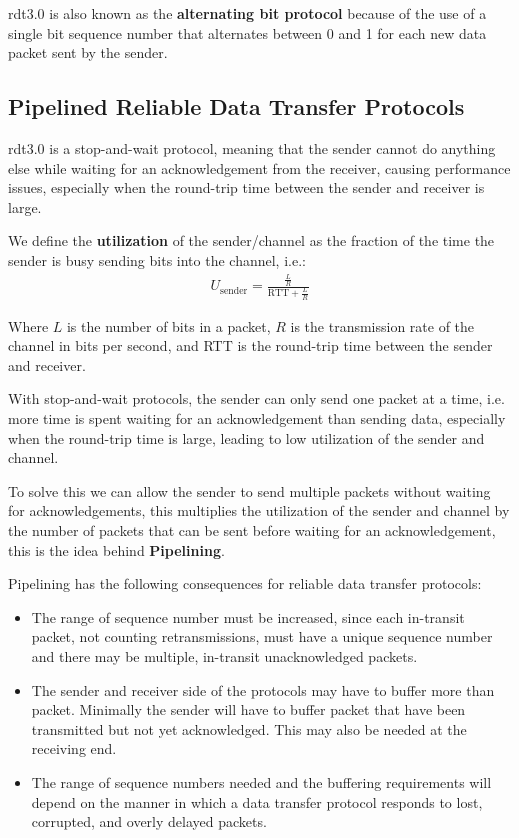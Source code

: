 \documentclass[12pt letter]{report}
\begin{document}
rdt3.0 is also known as the \textbf{alternating bit protocol} because
of the use of a single bit sequence number that alternates between 0
and 1 for each new data packet sent by the sender.

\subsection{Pipelined Reliable Data Transfer Protocols}

rdt3.0 is a stop-and-wait protocol, meaning that the sender cannot do
anything else while waiting for an acknowledgement from the receiver,
causing performance issues, especially when the round-trip time
between the sender and receiver is large.

We define the \textbf{utilization} of the sender/channel as the
fraction of the time the sender is busy sending bits into the channel, i.e.:
\begin{align*}
  U_\text{sender} = \frac{\frac{L}{R}}{\text{RTT} + \frac{L}{R}}
\end{align*}

Where $L$ is the number of bits in a packet, $R$ is the transmission
rate of the channel in bits per second, and RTT is the round-trip
time between the sender and receiver.

With stop-and-wait protocols, the sender can only send one packet at
a time, i.e. more time is spent waiting for an acknowledgement than
sending data, especially when the round-trip time is large, leading
to low utilization of the sender and channel.

To solve this we can allow the sender to send multiple packets
without waiting for acknowledgements, this multiplies the utilization
of the sender and channel by the number of packets that can be sent
before waiting for an acknowledgement, this is the idea behind
\textbf{Pipelining}.

Pipelining has the following consequences for reliable data transfer protocols:
\begin{itemize}
  \item  The range of sequence number must be increased, since each
    in-transit packet, not counting retransmissions, must have a
    unique sequence number and there may be multiple, in-transit
    unacknowledged packets.
  \item The sender and receiver side of the protocols may have to
    buffer more than packet. Minimally the sender will have to buffer
    packet that have been transmitted but not yet acknowledged. This
    may also be needed at the receiving end.
  \item The range of sequence numbers needed and the buffering
    requirements will depend on the manner in which a data transfer
    protocol responds to lost, corrupted, and overly delayed packets.
\end{itemize}
\end{document}
